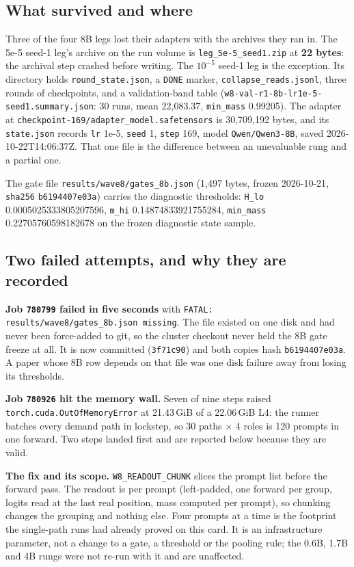 \documentclass[11pt,a4paper]{article}
\begin{document}
\subsection*{What survived and where}

Three of the four 8B legs lost their adapters with the archives they ran in. The 5e-5 seed-1 leg's
archive on the run volume is \texttt{leg\_5e-5\_seed1.zip} at \textbf{22 bytes}: the archival step
crashed before writing. The $10^{-5}$ seed-1 leg is the exception. Its directory holds
\texttt{round\_state.json}, a \texttt{DONE} marker, \texttt{collapse\_reads.jsonl}, three rounds of
checkpoints, and a validation-band table
(\texttt{w8-val-r1-8b-lr1e-5-seed1.summary.json}: 30 runs, mean 22{,}083.37, \texttt{min\_mass}
0.99205). The adapter at \texttt{checkpoint-169/adapter\_model.safetensors} is 30{,}709{,}192 bytes,
and its \texttt{state.json} records \texttt{lr} 1e-5, \texttt{seed} 1, \texttt{step} 169, model
\texttt{Qwen/Qwen3-8B}, saved 2026-10-22T14:06:37Z. That one file is the difference between an
unevaluable rung and a partial one.

The gate file \texttt{results/wave8/gates\_8b.json} (1{,}497 bytes, frozen 2026-10-21,
\texttt{sha256} \texttt{b6194407e03a}) carries the diagnostic thresholds: \texttt{H\_lo}
0.0005025333805207596, \texttt{m\_hi} 0.14874833921755284, \texttt{min\_mass} 0.22705760598182678 on
the frozen diagnostic state sample.

\subsection*{Two failed attempts, and why they are recorded}

\textbf{Job \texttt{780799} failed in five seconds} with \texttt{FATAL: results/wave8/gates\_8b.json
missing}. The file existed on one disk and had never been force-added to git, so the cluster checkout
never held the 8B gate freeze at all. It is now committed (\texttt{3f71c90}) and both copies hash
\texttt{b6194407e03a}. A paper whose 8B row depends on that file was one disk failure away from losing
its thresholds.

\textbf{Job \texttt{780926} hit the memory wall.} Seven of nine steps raised
\texttt{torch.cuda.OutOfMemoryError} at 21.43\,GiB of a 22.06\,GiB L4: the runner batches every demand
path in lockstep, so 30 paths $\times$ 4 roles is 120 prompts in one forward. Two steps landed first
and are reported below because they are valid.

\textbf{The fix and its scope.} \texttt{W8\_READOUT\_CHUNK} slices the prompt list before the forward
pass. The readout is per prompt (left-padded, one forward per group, logits read at the last real
position, mass computed per prompt), so chunking changes the grouping and nothing else. Four prompts
at a time is the footprint the single-path runs had already proved on this card. It is an
infrastructure parameter, not a change to a gate, a threshold or the pooling rule; the 0.6B, 1.7B and
4B rungs were not re-run with it and are unaffected.
\end{document}
